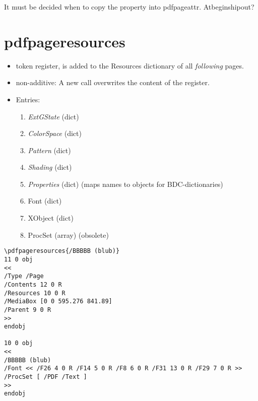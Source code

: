\documentclass{article}
\begin{document}
It must be decided when to copy the property into pdfpageattr. Atbeginshipout?

\section{pdfpageresources}
\begin{itemize}
\item token register, is added to the Resources dictionary of all \emph{following} pages.
\item non-additive: A new call overwrites the content of the register.
\item Entries:
 \begin{enumerate}
 \item \emph{ExtGState} (dict)
 \item \emph{ColorSpace} (dict)
 \item \emph{Pattern} (dict)
 \item \emph{Shading} (dict)
 \item \emph{Properties} (dict) (maps names to objects for BDC-dictionaries)
 \item Font (dict)
 \item XObject (dict)
 \item ProcSet (array) (obsolete)
 \end{enumerate}

\end{itemize}
\begin{verbatim}
\pdfpageresources{/BBBBB (blub)}
11 0 obj
<<
/Type /Page
/Contents 12 0 R
/Resources 10 0 R
/MediaBox [0 0 595.276 841.89]
/Parent 9 0 R
>>
endobj

10 0 obj
<<
/BBBBB (blub)
/Font << /F26 4 0 R /F14 5 0 R /F8 6 0 R /F31 13 0 R /F29 7 0 R >>
/ProcSet [ /PDF /Text ]
>>
endobj
\end{verbatim}
\end{document}
